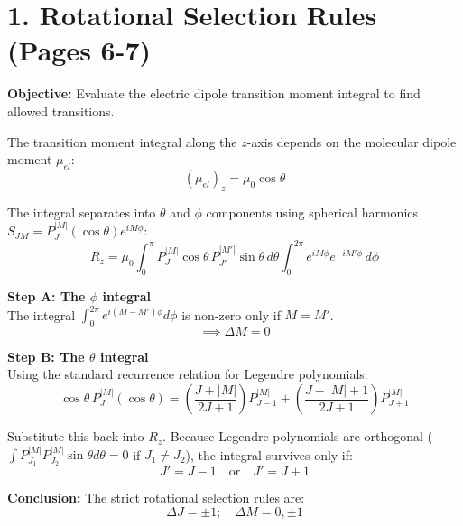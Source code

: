 \documentclass{book}
\begin{document}
\section*{1. Rotational Selection Rules (Pages 6-7)}

\textbf{Objective:} Evaluate the electric dipole transition moment integral to find allowed transitions. %

The transition moment integral along the $z$-axis depends on the molecular dipole moment $\mu_{el}$: %
\begin{equation}
    (\mu_{el})_z = \mu_0 \cos\theta
\end{equation}

The integral separates into $\theta$ and $\phi$ components using spherical harmonics $S_{JM} = P_J^{|M|}(\cos\theta)e^{iM\phi}$: %
\begin{equation}
    R_z = \mu_0 \int_0^\pi P_J^{|M|} \cos\theta \, P_{J'}^{|M'|} \sin\theta \, d\theta \int_0^{2\pi} e^{iM\phi} e^{-iM'\phi} \, d\phi
\end{equation}

\textbf{Step A: The $\phi$ integral} \\
The integral $\int_0^{2\pi} e^{i(M-M')\phi} d\phi$ is non-zero only if $M = M'$. %
\begin{equation}
    \implies \Delta M = 0
\end{equation}

\textbf{Step B: The $\theta$ integral} \\
Using the standard recurrence relation for Legendre polynomials: %
\begin{equation}
    \cos\theta \, P_J^{|M|}(\cos\theta) = \left( \frac{J+|M|}{2J+1} \right) P_{J-1}^{|M|} + \left( \frac{J-|M|+1}{2J+1} \right) P_{J+1}^{|M|}
\end{equation}

Substitute this back into $R_z$. Because Legendre polynomials are orthogonal ($\int P_{J_1}^{|M|} P_{J_2}^{|M|} \sin\theta d\theta = 0$ if $J_1 \neq J_2$), the integral survives only if: %
\begin{equation}
    J' = J - 1 \quad \text{or} \quad J' = J + 1
\end{equation}

\textbf{Conclusion:} The strict rotational selection rules are:
\begin{equation}
    \Delta J = \pm 1; \quad \Delta M = 0, \pm 1
\end{equation}
\end{document}
